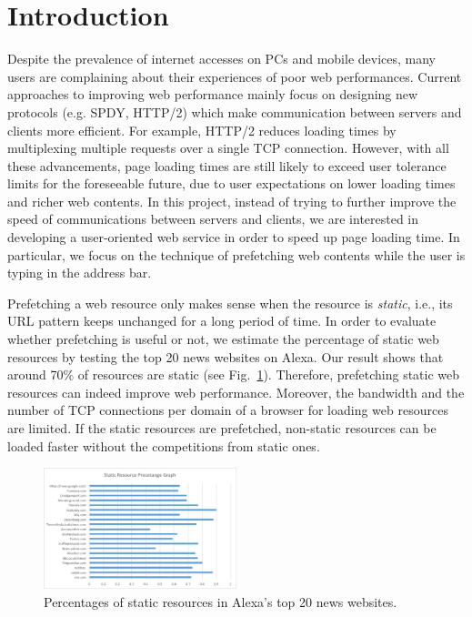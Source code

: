 \section{Introduction}
\label{sec:intro}

Despite the prevalence of internet accesses on PCs and mobile devices, many users are complaining about their experiences of poor web performances. Current approaches to improving web performance mainly focus on designing new protocols (e.g. SPDY, HTTP/2) which make communication between servers and clients more efficient. For example, HTTP/2 reduces loading times by multiplexing multiple requests over a single TCP connection. However, with all these advancements, page loading times are still likely to exceed user tolerance limits for the foreseeable future, due to user expectations on lower loading times and richer web contents. In this project, instead of trying to further improve the speed of communications between servers and clients, we are interested in developing a user-oriented web service in order to speed up page loading time. In particular, we focus on the technique of prefetching web contents while the user is typing in the address bar.

Prefetching a web resource only makes sense when the resource is \emph{static}, i.e., its URL pattern keeps unchanged for a long period of time. In order to evaluate whether prefetching is useful or not, we estimate the percentage of static web resources by testing the top 20 news websites on Alexa. Our result shows that around 70\% of resources are static (see Fig.~\ref{fig:static_resource_precentage}). Therefore, prefetching static web resources can indeed improve web performance. Moreover, the bandwidth and the number of TCP connections per domain of a browser for loading web resources are limited. If the static resources are prefetched, non-static resources can be loaded faster without the competitions from static ones.

\begin{figure}[htbp] 
	\centering
	\includegraphics[width=0.5\textwidth]{static_resource_precentage.png}  
	\caption{Percentages of static resources in Alexa's top 20 news websites.}
	\label{fig:static_resource_precentage}
\end{figure} 

